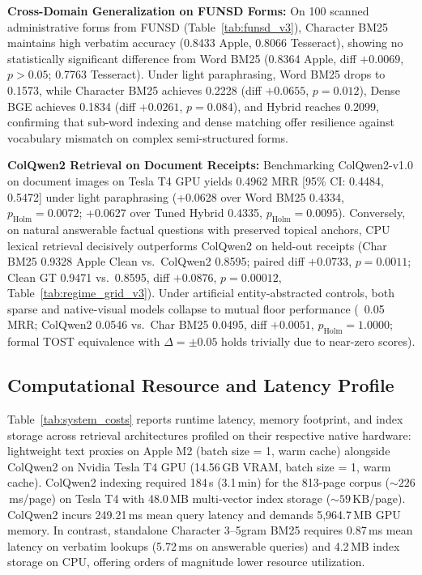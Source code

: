 \textbf{Cross-Domain Generalization on FUNSD Forms:} On 100 scanned administrative forms from FUNSD \cite{jaume2019funsd} (Table~\ref{tab:funsd_v3}), Character BM25 maintains high verbatim accuracy (0.8433 Apple, 0.8066 Tesseract), showing no statistically significant difference from Word BM25 (0.8364 Apple, diff $+0.0069$, $p > 0.05$; 0.7763 Tesseract). Under light paraphrasing, Word BM25 drops to 0.1573, while Character BM25 achieves 0.2228 (diff $+0.0655$, $p = 0.012$), Dense BGE achieves 0.1834 (diff $+0.0261$, $p = 0.084$), and Hybrid reaches 0.2099, confirming that sub-word indexing and dense matching offer resilience against vocabulary mismatch on complex semi-structured forms.

\textbf{ColQwen2 Retrieval on Document Receipts:} Benchmarking ColQwen2-v1.0 \cite{faysse2024colqwen2} on document images on Tesla T4 GPU yields 0.4962 MRR [95\% CI: 0.4484, 0.5472] under light paraphrasing (+0.0628 over Word BM25 0.4334, $p_{\text{Holm}} = 0.0072$; +0.0627 over Tuned Hybrid 0.4335, $p_{\text{Holm}} = 0.0095$). Conversely, on natural answerable factual questions with preserved topical anchors, CPU lexical retrieval decisively outperforms ColQwen2 on held-out receipts (Char BM25 0.9328 Apple Clean vs.\ ColQwen2 0.8595; paired diff $+0.0733$, $p = 0.0011$; Clean GT 0.9471 vs.\ 0.8595, diff $+0.0876$, $p=0.00012$, Table~\ref{tab:regime_grid_v3}). Under artificial entity-abstracted controls, both sparse and native-visual models collapse to mutual floor performance (~0.05 MRR; ColQwen2 0.0546 vs.\ Char BM25 0.0495, diff $+0.0051$, $p_{\text{Holm}}=1.0000$; formal TOST equivalence with $\Delta=\pm 0.05$ holds trivially due to near-zero scores).

\subsection{Computational Resource and Latency Profile}
\label{sec:system_costs_eval}

Table~\ref{tab:system_costs} reports runtime latency, memory footprint, and index storage across retrieval architectures profiled on their respective native hardware: lightweight text proxies on Apple M2 (batch size = 1, warm cache) alongside ColQwen2 on Nvidia Tesla T4 GPU (14.56\,GB VRAM, batch size = 1, warm cache). ColQwen2 indexing required 184\,s (3.1\,min) for the 813-page corpus ($\sim 226$\,ms/page) on Tesla T4 with 48.0\,MB multi-vector index storage ($\sim 59$\,KB/page). ColQwen2 incurs 249.21\,ms mean query latency and demands 5,964.7\,MB GPU memory. In contrast, standalone Character 3--5gram BM25 requires 0.87\,ms mean latency on verbatim lookups (5.72\,ms on answerable queries) and 4.2\,MB index storage on CPU, offering orders of magnitude lower resource utilization.

